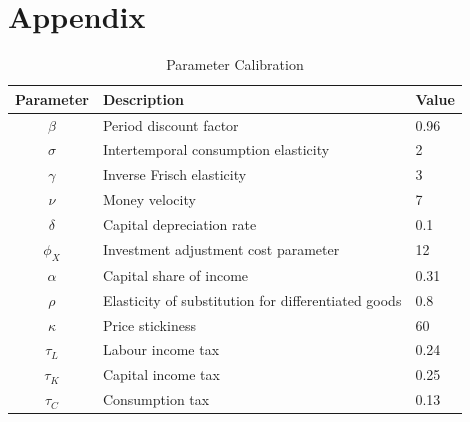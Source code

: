\documentclass[12pt]{article}
\begin{document}
\section{Appendix}
\begin{table}[ht]
    \centering
    \caption{Parameter Calibration}\label{tab:parameters}
    \begin{tabular}{cll}
        \toprule
        Parameter & Description & Value  \\ \midrule
        $\beta$ & Period discount factor  & 0.96  \\
        $\sigma$ & Intertemporal consumption elasticity  & 2  \\
        $\gamma$ & Inverse Frisch elasticity  & 3  \\
        $\nu$ & Money velocity  & 7  \\
        $\delta$ & Capital depreciation rate  & 0.1  \\
        $\phi_X$ & Investment adjustment cost parameter & 12  \\
        $\alpha$ & Capital share of income & 0.31  \\
        $\rho$ & Elasticity of substitution for differentiated goods &  0.8  \\
        $\kappa$ & Price stickiness & 60 \\
        ${\tau_L}$ & Labour income tax & 0.24 \\
        ${\tau_K}$ & Capital income tax & 0.25 \\
        ${\tau_C}$ & Consumption tax & 0.13 \\
    \bottomrule
    \end{tabular}
\end{table}
\end{document}
